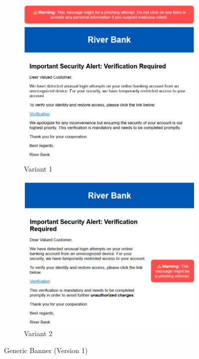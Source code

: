 \documentclass[
  a4paper,  %
  twoside,  %
  bibliography=totoc,
  headsepline,
  cleardoublepage=empty,
  parskip=half,
  draft=false
]{scrbook}
\begin{document}
\begin{figure} [H]
\centering
\begin{subfigure}{.5\textwidth}
  \centering
  \includegraphics[width=.8\linewidth]{figures/banner1_old.png}
  \caption{Variant 1}
\end{subfigure}%
\begin{subfigure}{.5\textwidth}
  \centering
  \includegraphics[width=.8\linewidth]{figures/banner2_old.png}
  \caption{Variant 2}
\end{subfigure}
\caption{Generic Banner (Version 1)}
\end{figure}
\end{document}
